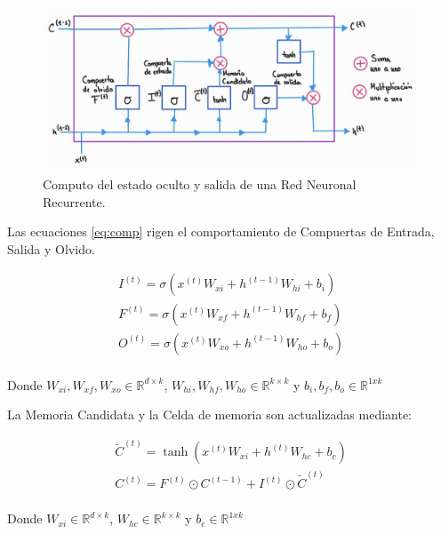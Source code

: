 \begin{figure}[ht!]
\centering
\includegraphics[width=1.0 \textwidth]{Chapters/1. Transformer/Figures/rnn/lstm.jpg}
\caption{Computo del estado oculto y salida de una Red Neuronal Recurrente.}
\label{fig:rnn_lstm}
\end{figure}

Las ecuaciones \ref{eq:comp} rigen el comportamiento de Compuertas de Entrada, Salida y Olvido.

\begin{equation}
    \begin{split}
        I^{(t)} =  \sigma(x^{(t)} W_{xi} + h^{(t-1)} W_{hi} + b_i)\\
        F^{(t)} =  \sigma(x^{(t)} W_{xf} + h^{(t-1)} W_{hf} + b_f)\\
        O^{(t)} =  \sigma(x^{(t)} W_{xo} + h^{(t-1)} W_{ho} + b_o)\\
    \end{split}
    \label{eq:comp}
\end{equation}

Donde $W_{xi}, W_{xf}, W_{xo} \in \mathbb{R}^{d \times k}$,
$W_{hi}, W_{hf}, W_{ho} \in \mathbb{R}^{k \times k}$ y $b_i, b_f, b_o \in \mathbb{R}^{1xk}$

La Memoria Candidata y la Celda de memoria son actualizadas mediante:

\begin{equation}
    \begin{split}
        \tilde C^{(t)} =  \tanh(x^{(t)} W_{xi} + h^{(t)} W_{hc} + b_c)\\
        C^{(t)} =  F^{(t)} \odot C^{(t-1)} + I^{(t)} \odot \tilde C^{(t)} \\
    \end{split}
\end{equation}

Donde $W_{xi} \in \mathbb{R}^{d \times k}$,
$W_{hc} \in \mathbb{R}^{k \times k}$ y $b_c \in \mathbb{R}^{1xk}$

